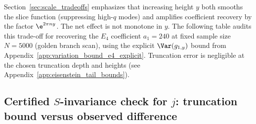 Section~\ref{sec:scale_tradeoffs} emphasizes that increasing height $y$ both smooths the slice function (suppressing high-$q$ modes) and amplifies coefficient recovery by the factor $\e^{2\pi n y}$. The net effect is not monotone in $y$. The following table audits this trade-off for recovering the $E_4$ coefficient $a_1=240$ at fixed sample size $N=5000$ (golden branch scan), using the explicit $\Var(g_{1,y})$ bound from Appendix~\ref{app:variation_bound_e4_explicit}. Truncation error is negligible at the chosen truncation depth and heights (see Appendix~\ref{app:eisenstein_tail_bounds}).

\begin{table}[H]
\centering
{}
\caption{Height trade-off for slice--sampling recovery of the $E_4$ coefficient $a_1=240$ at fixed $N=5000$ (golden branch scan). The bound is the explicit instance of Theorem~\ref{thm:finiteN_coeff_bound} using Appendix~\ref{app:variation_bound_e4_explicit}. The truncation-bound column reports $\log_{10}$ of the truncation contribution to the recovered coefficient bound, showing it is astronomically negligible at the chosen truncation depth. Reproducible via Experiment~VI in Appendix~\ref{app:repro_code}.}
\label{tab:e4_slice_sampling_y_tradeoff}
\end{table}

\subsection{Certified \texorpdfstring{$S$}{S}-invariance check for \texorpdfstring{$j$}{j}: truncation bound versus observed difference}
\label{app:quant_fits_j_certified}

